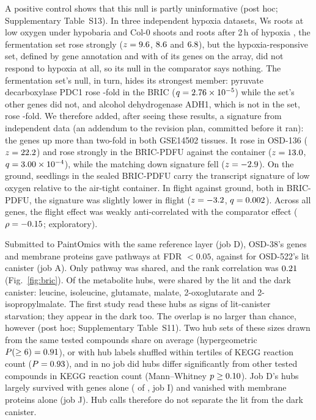 \documentclass{npjlayout}
\begin{document}
A positive control shows that this null is partly uninformative (post hoc; Supplementary
Table~S13). In three independent hypoxia datasets, Ws roots at low oxygen under hypobaria
\citep{osd136,zhou2017} and Col-0 shoots and roots after 2\,h of hypoxia
\citep{mustroph2009,gse14502}, the fermentation set rose strongly ($z = 9.6$,
$8.6$ and $6.8$), but the hypoxia-responsive set, defined by gene annotation and with
\nHypMeasured{} of its \nHypSet{} genes on the array, did not respond to hypoxia at all, so its null
in the comparator says nothing. The fermentation set's null, in turn, hides its strongest member:
pyruvate decarboxylase PDC1 rose \foldPdcHw-fold in the BRIC ($q = 2.76\times10^{-5}$) while the set's other
genes did not, and alcohol dehydrogenase ADH1, which is not in the set, rose \foldAdhHw-fold. We
therefore added, after seeing these results, a signature from independent data (an addendum to the
revision plan, committed before it ran): the \nHypUp{} genes up more than two-fold in both
GSE14502 tissues. It rose in OSD-136 ($z = 22.2$) and rose strongly in the
BRIC-PDFU against the container ($z = 13.0$, $q = 3.00\times10^{-4}$), while the matching down signature
fell ($z = -2.9$). On the ground, seedlings in the sealed BRIC-PDFU carry the transcript
signature of low oxygen relative to the air-tight container. In flight against ground, both in
BRIC-PDFU, the signature was slightly lower in flight ($z = -3.2$, $q = 0.002$).
Across all genes, the flight effect was weakly anti-correlated with the comparator effect
($\rho = -0.15$; exploratory).

Submitted to PaintOmics with the same reference layer (job D), OSD-38's genes and membrane
proteins gave \nPathD{} pathways at FDR $<0.05$, against \nPathA{} for OSD-522's lit canister
(job A). Only \nPathAD{} pathway was shared, and the rank correlation was $0.21$
(Fig.~\ref{fig:bric}). Of the metabolite hubs, \nHubAD{} were shared by the lit and the dark
canister: leucine, isoleucine, glutamate, malate, 2-oxoglutarate and 2-isopropylmalate. The first
study read these hubs as signs of lit-canister starvation; they appear in the dark too. The overlap
is no larger than chance, however (post hoc; Supplementary Table~S11). Two hub sets of these sizes
drawn from the same \nHubCand{} tested compounds share \hubOverlapExp{} on average
(hypergeometric $P(\ge6) = 0.91$), or \hubOverlapExpPerm{} with hub labels shuffled
within tertiles of KEGG reaction count ($P = 0.93$), and in no job did hubs differ
significantly from other tested compounds in KEGG reaction count (Mann--Whitney $p \ge 0.10$). Job D's
hubs largely survived with genes alone (\nHubI{} of \nHubD, job I) and vanished with membrane
proteins alone (job J). Hub calls therefore do not separate the lit from the dark canister.
\end{document}
